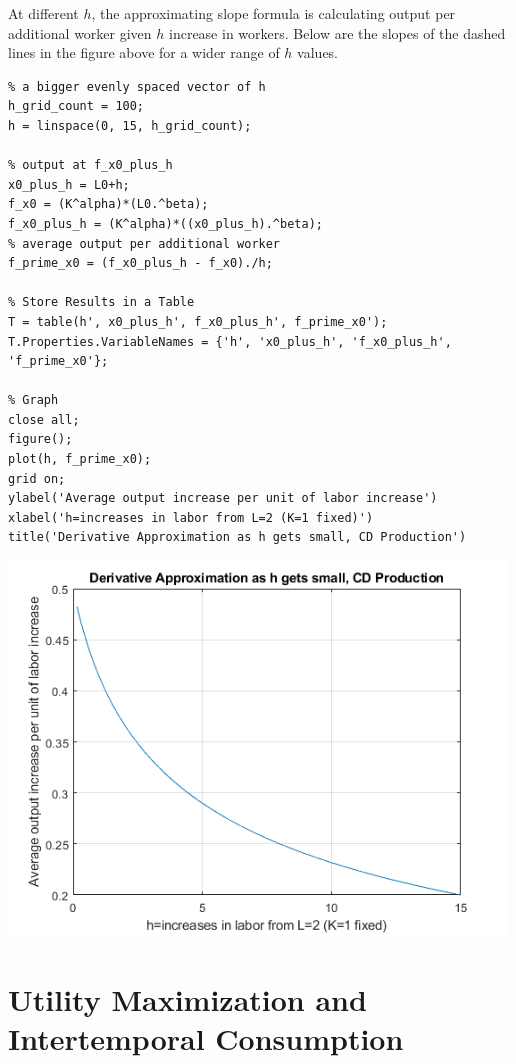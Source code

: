 \documentclass[
]{book}
\begin{document}
At different \(h\), the approximating slope formula is calculating output
per additional worker given \(h\) increase in workers. Below are the
slopes of the dashed lines in the figure above for a wider range of \(h\)
values.

\begin{verbatim}
% a bigger evenly spaced vector of h
h_grid_count = 100;
h = linspace(0, 15, h_grid_count);

% output at f_x0_plus_h
x0_plus_h = L0+h;
f_x0 = (K^alpha)*(L0.^beta);
f_x0_plus_h = (K^alpha)*((x0_plus_h).^beta);
% average output per additional worker
f_prime_x0 = (f_x0_plus_h - f_x0)./h;

% Store Results in a Table
T = table(h', x0_plus_h', f_x0_plus_h', f_prime_x0');
T.Properties.VariableNames = {'h', 'x0_plus_h', 'f_x0_plus_h', 'f_prime_x0'};

% Graph
close all;
figure();
plot(h, f_prime_x0);
grid on;
ylabel('Average output increase per unit of labor increase')
xlabel('h=increases in labor from L=2 (K=1 fixed)')
title('Derivative Approximation as h gets small, CD Production')
\end{verbatim}

\includegraphics[width=5.20833in,height=\textheight]{img/derivative_hslope_cobb_douglas_images/figure_2.png}

\hypertarget{utility-maximization-and-intertemporal-consumption}{%
\section{Utility Maximization and Intertemporal Consumption}\label{utility-maximization-and-intertemporal-consumption}}
\end{document}
